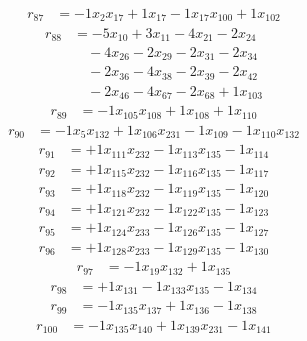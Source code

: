 \[\begin{aligned}
r_{87} &= - 1 x_{2} x_{17} + 1 x_{17} - 1 x_{17} x_{100} + 1 x_{102}
\end{aligned}\]
\[\begin{aligned}
r_{88} &= - 5 x_{10} + 3 x_{11} - 4 x_{21} - 2 x_{24} \\
 &\quad - 4 x_{26} - 2 x_{29} - 2 x_{31} - 2 x_{34} \\
 &\quad - 2 x_{36} - 4 x_{38} - 2 x_{39} - 2 x_{42} \\
 &\quad - 2 x_{46} - 4 x_{67} - 2 x_{68} + 1 x_{103}
\end{aligned}\]
\[\begin{aligned}
r_{89} &= - 1 x_{105} x_{108} + 1 x_{108} + 1 x_{110}
\end{aligned}\]
\[\begin{aligned}
r_{90} &= - 1 x_{5} x_{132} + 1 x_{106} x_{231} - 1 x_{109} - 1 x_{110} x_{132}
\end{aligned}\]
\[\begin{aligned}
r_{91} &= + 1 x_{111} x_{232} - 1 x_{113} x_{135} - 1 x_{114}
\end{aligned}\]
\[\begin{aligned}
r_{92} &= + 1 x_{115} x_{232} - 1 x_{116} x_{135} - 1 x_{117}
\end{aligned}\]
\[\begin{aligned}
r_{93} &= + 1 x_{118} x_{232} - 1 x_{119} x_{135} - 1 x_{120}
\end{aligned}\]
\[\begin{aligned}
r_{94} &= + 1 x_{121} x_{232} - 1 x_{122} x_{135} - 1 x_{123}
\end{aligned}\]
\[\begin{aligned}
r_{95} &= + 1 x_{124} x_{233} - 1 x_{126} x_{135} - 1 x_{127}
\end{aligned}\]
\[\begin{aligned}
r_{96} &= + 1 x_{128} x_{233} - 1 x_{129} x_{135} - 1 x_{130}
\end{aligned}\]
\[\begin{aligned}
r_{97} &= - 1 x_{19} x_{132} + 1 x_{135}
\end{aligned}\]
\[\begin{aligned}
r_{98} &= + 1 x_{131} - 1 x_{133} x_{135} - 1 x_{134}
\end{aligned}\]
\[\begin{aligned}
r_{99} &= - 1 x_{135} x_{137} + 1 x_{136} - 1 x_{138}
\end{aligned}\]
\[\begin{aligned}
r_{100} &= - 1 x_{135} x_{140} + 1 x_{139} x_{231} - 1 x_{141}
\end{aligned}\]
